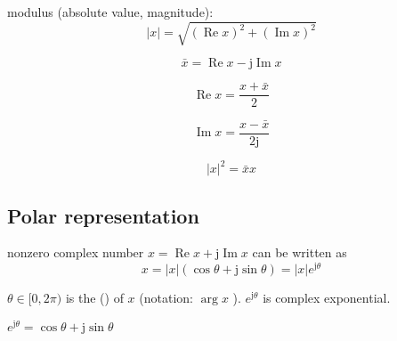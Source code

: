 \begin{definition}[Modulus]
    modulus (absolute value, magnitude): $$ |x|=\sqrt{(\operatorname{Re} x)^{2}+(\operatorname{Im} x)^{2}} $$
\end{definition}

\begin{definition}[Conjugate]
    $$ \bar{x}=\operatorname{Re} x-\mathrm{j} \operatorname{Im} x $$
\end{definition}

\begin{theorem}
    $$ \operatorname{Re} x=\frac{x+\bar{x}}{2} $$
\end{theorem}

\begin{theorem}
    $$ \operatorname{Im} x=\frac{x-\bar{x}}{2 \mathrm{j}} $$
\end{theorem}

\begin{theorem}
    $$ |x|^{2}=\bar{x} x $$
\end{theorem}

\subsection{Polar representation}

\begin{theorem}
    nonzero complex number $ x=\operatorname{Re} x+\mathrm{j} \operatorname{Im} x $ can be written as
$$
x=|x|(\cos \theta+\mathrm{j} \sin \theta)=|x| e^{\mathrm{j} \theta}
$$

$ \theta \in[0,2 \pi) $ is the  () of $ x $ (notation: $ \arg x $ ). $ e^{\mathrm{j} \theta} $ is complex exponential.
\end{theorem}

\begin{theorem}
    $ e^{\mathrm{j} \theta}=\cos \theta+\mathrm{j} \sin \theta $
\end{theorem}

